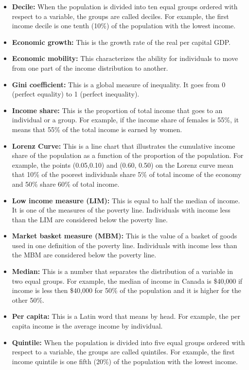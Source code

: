 \documentclass[letterpaper]{article}\usepackage[]{graphicx}\usepackage[]{color}
\numberwithin{exer}{section}
\theoremstyle{nonumberplain}
\begin{document}
\begin{itemize}
\item \textbf{Decile:} When the population is divided into ten equal
  groups ordered with respect to a variable, the groups are called
  deciles. For example, the first income decile is one tenth (10\%) of
  the population with the lowest income.  
\item \textbf{Economic growth:} This is the growth rate of the real
  per capital GDP.
\item \textbf{Economic mobility:} This characterizes the ability for
  individuals to move from one part of the income distribution to
  another.  
\item \textbf{Gini coefficient:} This is a global measure of
  inequality. It goes from 0 (perfect equality) to 1 (perfect
  inequality). 
\item \textbf{Income share:} This is the proportion of total income
  that goes to an individual or a group. For example, if the income
  share of females is 55\%, it means that 55\% of the total income is
  earned by women.
\item \textbf{Lorenz Curve:} This is a line chart that illustrates the
  cumulative income share of the population as a function of the
  proportion of the population. For example, the points (0.05,0.10)
  and (0.60, 0.50) on the Lorenz curve mean that 10\% of the poorest
  individuals share 5\% of total income of the economy and 50\% share
  60\% of total income.  
\item \textbf{Low income measure (LIM):} This is equal to half the
  median of income. It is one of the measures of the poverty
  line. Individuals with income less than the LIM are considered below
  the poverty line.
\item \textbf{Market basket measure (MBM):} This is the value of a
  basket of goods used in one definition of the poverty
  line. Individuals with income less than the MBM are considered below
  the poverty line.
\item \textbf{Median:} This is a number that separates the
  distribution of a variable in two equal groups. For example, the
  median of income in Canada is \$40,000 if income is less then
  \$40,000 for 50\% of the population and it is higher for the other
  50\%.
\item \textbf{Per capita:} This is a Latin word that means by
  head. For example, the per capita income is the average income by
  individual.
\item \textbf{Quintile:} When the population is divided into five
  equal groups ordered with respect to a variable, the groups are
  called quintiles. For example, the first income quintile is one
  fifth (20\%) of the population with the lowest income.
\end{itemize}
\end{document}
